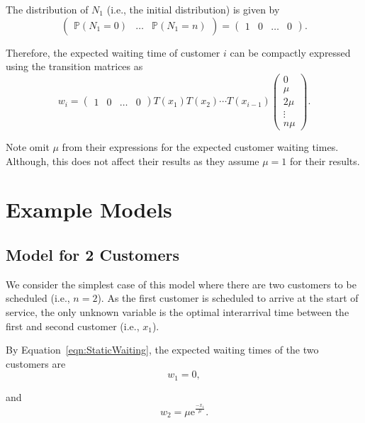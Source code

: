The distribution of $N_{1}$ (i.e., the initial distribution) is given by
\begin{equation}
	\left( \begin{array}{ccc} \mathbb{P} (N_{1} = 0) & \ldots & \mathbb{P} (N_{1} = n) \end{array} \right) = \left( \begin{array}{cccc} 1 & 0 & \ldots & 0 \end{array} \right).
\end{equation}

Therefore, the expected waiting time of customer $i$ can be compactly expressed using the transition matrices as
\begin{equation}
	w_{i}
	= \left( \begin{array}{cccc} 1 & 0 & \ldots & 0 \end{array} \right)
	T (x_{1}) T (x_{2}) \cdots T (x_{i - 1})
	\left( \begin{array}{c} 0 \\ \mu \\ 2 \mu \\ \vdots \\ n \mu \end{array} \right).
	\label{eqn:StaticWaiting}
\end{equation}

Note \citet{Stein} omit $\mu$ from their expressions for the expected customer waiting times. Although, this does not affect their results as they assume $\mu = 1$ for their results.

\section{Example Models}
\subsection{Model for 2 Customers}
\label{sec:StaticTwoCust}
We consider the simplest case of this model where there are two customers to be scheduled (i.e., $n = 2$). As the first customer is scheduled to arrive at the start of service, the only unknown variable is the optimal interarrival time between the first and second customer (i.e., $x_{1}$).

By Equation~\ref{eqn:StaticWaiting}, the expected waiting times of the two customers are
\begin{equation}
	w_{1} = 0,
\end{equation}

and
\begin{equation}
	w_{2} = \mu \mathrm{e}^{\frac{- x_{1}}{\mu}}.
\end{equation}

